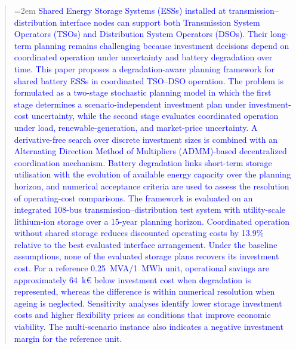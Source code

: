 \documentclass[preprint,12pt]{elsarticle}
\begin{document}
\begin{frontmatter}
\begin{abstract}
    \begingroup
    \emergencystretch=2em
    \textcolor{blue}{
        Shared Energy Storage Systems (ESSs) installed at transmission--distribution interface nodes can support both Transmission System Operators (TSOs) and Distribution System Operators (DSOs). Their long-term planning remains challenging because investment decisions depend on coordinated operation under uncertainty and battery degradation over time.
        This paper proposes a degradation-aware planning framework for shared battery ESSs in coordinated TSO--DSO operation. The problem is formulated as a two-stage stochastic planning model in which the first stage determines a scenario-independent investment plan under investment-cost uncertainty, while the second stage evaluates coordinated operation under load, renewable-generation, and market-price uncertainty. A derivative-free search over discrete investment sizes is combined with an Alternating Direction Method of Multipliers (ADMM)-based decentralized coordination mechanism. Battery degradation links short-term storage utilisation with the evolution of available energy capacity over the planning horizon, and numerical acceptance criteria are used to assess the resolution of operating-cost comparisons.
        The framework is evaluated on an integrated 108-bus transmission--distribution test system with utility-scale lithium-ion storage over a 15-year planning horizon. Coordinated operation without shared storage reduces discounted operating costs by 13.9\% relative to the best evaluated interface arrangement. Under the baseline assumptions, none of the evaluated storage plans recovers its investment cost. For a reference 0.25~MVA/1~MWh unit, operational savings are approximately 64~k\euro{} below investment cost when degradation is represented, whereas the difference is within numerical resolution when ageing is neglected. Sensitivity analyses identify lower storage investment costs and higher flexibility prices as conditions that improve economic viability. The multi-scenario instance also indicates a negative investment margin for the reference unit.
    }    
    \par
    \endgroup
\end{abstract}



\end{frontmatter}
\end{document}

